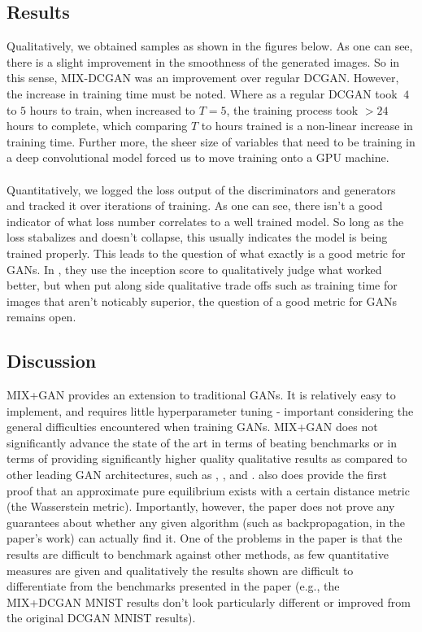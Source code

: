 \documentclass{article}
\begin{document}
\subsection{Results}
Qualitatively, we obtained samples as shown in the figures below. As one can see, there is a slight improvement in the smoothness of the generated images. So in this sense, MIX-DCGAN was an improvement over regular DCGAN. However, the increase in training time must be noted. Where as a regular DCGAN took $~4$ to $5$ hours to train, when increased to $T=5$, the training process took $>24$ hours to complete, which comparing $T$ to hours trained is a non-linear increase in training time. Further more, the sheer size of variables that need to be training in a deep convolutional model forced us to move training onto a GPU machine. 
\\\\
Quantitatively, we logged the loss output of the discriminators and generators and tracked it over iterations of training. As one can see, there isn't a good indicator of what loss number correlates to a well trained model. So long as the loss stabalizes and doesn't collapse, this usually indicates the model is being trained properly. This leads to the question of what exactly is a good metric for GANs. In \cite{Arora17}, they use the inception score to qualitatively judge what worked better, but when put along side qualitative trade offs such as training time for images that aren't noticably superior, the question of a good metric for GANs remains open. 

\subsection{Discussion}
MIX+GAN provides an extension to traditional GANs. It is relatively easy to implement, and requires little hyperparameter tuning - important considering the general difficulties encountered when training GANs. MIX+GAN does not significantly advance the state of the art in terms of beating benchmarks or in terms of providing significantly higher quality qualitative results as compared to other leading GAN architectures, such as \citet{DBLP:journals/corr/HuangLPHB16}, \citet{Salimans2016}, and \citet{DBLP:journals/corr/OdenaOS16}. \citet{Arora17} also does provide the first proof that an approximate pure equilibrium exists with a certain distance metric (the Wasserstein metric). Importantly, however, the paper does not prove any guarantees about whether any given algorithm (such as backpropagation, in the paper's work) can actually find it. One of the problems in the paper is that the results are difficult to benchmark against other methods, as few quantitative measures are given and qualitatively the results shown are difficult to differentiate from the benchmarks presented in the paper (e.g., the MIX+DCGAN MNIST results don't look particularly different or improved from the original DCGAN MNIST results).
\end{document}
